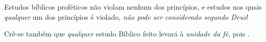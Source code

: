     Estudos bíblicos proféticos  não violam nenhum dos princípios, e estudos nos quais \emph{qualquer} um
    dos princípios é violado, \emph{não pode ser considerado segundo Deus}!

    Crê-se também que  \emph{qualquer}  estudo  Bíblico  feito    levará  à  \emph{unidade  da  fé},  pois
    .


